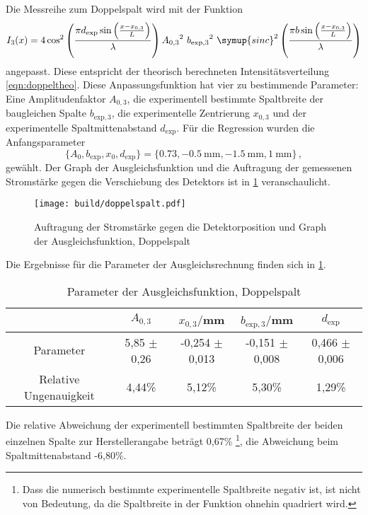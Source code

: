 Die Messreihe zum Doppelspalt wird mit der Funktion
\begin{equation}
  I_3 (x) = 4 \cos^2\left(\frac{\pi d_\text{exp} \sin\left(\frac{x-x_{0,3}}{L}\right)}{\lambda}\right) {A_{0,3}}^2 \,\, {b_{\text{exp},3}}^2 \,\,
  \symup{sinc}^2\left(\frac{\pi b \sin\left(\frac{x-x_{0,3}}{L}\right)}{\lambda}\right)
\end{equation}
angepasst. Diese entspricht der theorisch berechneten Intensitätsverteilung \eqref{eqn:doppeltheo}.
Diese Anpassungsfunktion hat vier zu bestimmende Parameter: Eine Amplitudenfaktor $A_{0,3}$,
die experimentell bestimmte Spaltbreite der baugleichen Spalte $b_{\text{exp},3}$,
die experimentelle Zentrierung $x_{0,3}$ und der experimentelle Spaltmittenabstand
$d_\text{exp}$.
Für die Regression wurden die Anfangsparameter
\begin{equation}
  \{A_0, b_{\text{exp}}, x_0, d_\text{exp}\} = \{0.73, \SI{-0.5}{\milli\meter}, \SI{-1.5}{\milli\meter}, \SI{1}{\milli\meter}\}\,,
\end{equation}
gewählt.
Der Graph der Ausgleichsfunktion und die Auftragung der gemessenen Stromstärke gegen
die Verschiebung des Detektors ist in \ref{fig:spalt3} veranschaulicht.

\begin{figure}
  \centering
  \texttt{[image: build/doppelspalt.pdf]}
  \caption{Auftragung der Stromstärke gegen die Detektorposition und Graph der Ausgleichsfunktion, Doppelspalt}
  \label{fig:spalt3}
\end{figure}

Die Ergebnisse für die Parameter der Ausgleichsrechnung finden sich in \ref{tab:paramsdoppel}.

\begin{table}
\centering
\begin{tabular}{ccccc}
\toprule
& $A_{0,3}$ & $x_{0,3}/$mm & $b_{\text{exp},3}/$mm & $d_\text{exp}$ \\
\midrule
Parameter & 5,85 $\pm$ 0,26 & -0,254 $\pm$ 0,013 & -0,151 $\pm$ 0,008 & 0,466 $\pm$ 0,006 \\
Relative Ungenauigkeit & 4,44\% & 5,12\% & 5,30\% & 1,29\%\\
\bottomrule
\end{tabular}
\caption{Parameter der Ausgleichsfunktion, Doppelspalt}
\label{tab:paramsdoppel}
\end{table}

Die relative Abweichung der experimentell bestimmten Spaltbreite der beiden einzelnen
Spalte zur Herstellerangabe beträgt 0,67\% \footnote{Dass die numerisch bestimmte
experimentelle Spaltbreite negativ ist, ist nicht von Bedeutung, da die Spaltbreite
in der Funktion ohnehin quadriert wird.}, die Abweichung beim Spaltmittenabstand
-6,80\%.

